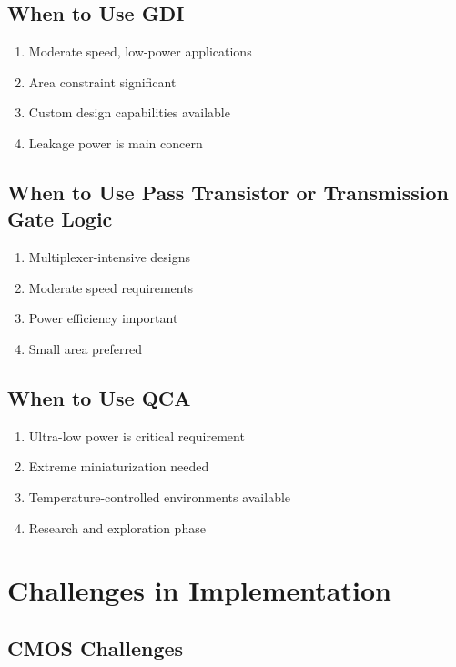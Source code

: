 \documentclass[12pt,a4paper,twoside]{report}
\begin{document}
\subsection{When to Use GDI}

\begin{enumerate}
    \item Moderate speed, low-power applications
    \item Area constraint significant
    \item Custom design capabilities available
    \item Leakage power is main concern
\end{enumerate}

\subsection{When to Use Pass Transistor or Transmission Gate Logic}

\begin{enumerate}
    \item Multiplexer-intensive designs
    \item Moderate speed requirements
    \item Power efficiency important
    \item Small area preferred
\end{enumerate}

\subsection{When to Use QCA}

\begin{enumerate}
    \item Ultra-low power is critical requirement
    \item Extreme miniaturization needed
    \item Temperature-controlled environments available
    \item Research and exploration phase
\end{enumerate}

\section{Challenges in Implementation}

\subsection{CMOS Challenges}
\end{document}
